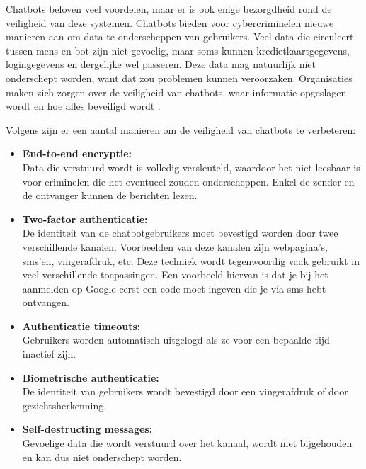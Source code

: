Chatbots beloven veel voordelen, maar er is ook enige bezorgdheid rond de veiligheid van deze systemen. Chatbots bieden voor cybercriminelen nieuwe manieren aan om data te onderscheppen van gebruikers. Veel data die circuleert tussen mens en bot zijn niet gevoelig, maar soms kunnen kredietkaartgegevens, logingegevens en dergelijke wel passeren. Deze data mag natuurlijk niet onderschept worden, want dat zou problemen kunnen veroorzaken. Organisaties maken zich zorgen over de veiligheid van chatbots, waar informatie opgeslagen wordt en hoe alles beveiligd wordt \autocite{Shanbhag2018}.


Volgens \textcite{Shanbhag2018} zijn er een aantal manieren om de veiligheid van chatbots te verbeteren:

\begin{itemize}
    \item \textbf{End-to-end encryptie:} \\
    
    Data die verstuurd wordt is volledig versleuteld, waardoor het niet leesbaar is voor criminelen die het eventueel zouden onderscheppen. Enkel de zender en de ontvanger kunnen de berichten lezen. \\
    
    \item \textbf{Two-factor authenticatie:} \\
    
    De identiteit van de chatbotgebruikers moet bevestigd worden door twee verschillende kanalen. Voorbeelden van deze kanalen zijn webpagina’s, sms’en, vingerafdruk, etc. Deze techniek wordt tegenwoordig vaak gebruikt in veel verschillende toepassingen. Een voorbeeld hiervan is dat je bij het aanmelden op Google eerst een code moet ingeven die je via sms hebt ontvangen. \\
    
    \item \textbf{Authenticatie timeouts:} \\
    
    Gebruikers worden automatisch uitgelogd als ze voor een bepaalde tijd inactief zijn. \\
    
    \item \textbf{Biometrische authenticatie:} \\
    
    De identiteit van gebruikers wordt bevestigd door een vingerafdruk of door gezichtsherkenning. \\
    
    \item \textbf{Self-destructing messages:} \\
    
    Gevoelige data die wordt verstuurd over het kanaal, wordt niet bijgehouden en kan dus niet onderschept worden. \\
\end{itemize}


